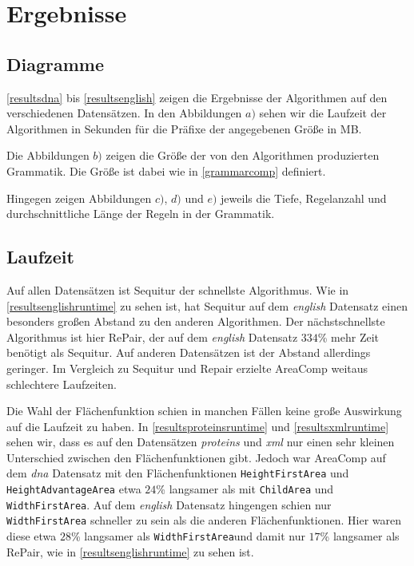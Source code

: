 \section{Ergebnisse}

\subsection{Diagramme}
\label{diagrams}

\autoref{resultsdna} bis \ref{resultsenglish} zeigen die Ergebnisse der Algorithmen auf den verschiedenen Datensätzen. In den Abbildungen $a)$ sehen wir die Laufzeit der Algorithmen in Sekunden für die Präfixe der angegebenen Größe in MB.

Die Abbildungen $b)$ zeigen die Größe der von den Algorithmen produzierten Grammatik. Die Größe ist dabei wie in \autoref{grammarcomp} definiert.

Hingegen zeigen Abbildungen $c)$, $d)$ und $e)$ jeweils die Tiefe, Regelanzahl und durchschnittliche Länge der Regeln in der Grammatik. 

\subsection{Laufzeit}

Auf allen Datensätzen ist Sequitur der schnellste Algorithmus. Wie in \autoref{resultsenglishruntime} zu sehen ist, hat Sequitur auf dem \emph{english} Datensatz einen besonders großen Abstand zu den anderen Algorithmen. Der nächstschnellste Algorithmus ist hier RePair, der auf dem \emph{english} Datensatz $334$\% mehr Zeit benötigt als Sequitur. Auf anderen Datensätzen ist der Abstand allerdings geringer.
Im Vergleich zu Sequitur und Repair erzielte AreaComp weitaus schlechtere Laufzeiten.

Die Wahl der Flächenfunktion schien in manchen Fällen keine große Auswirkung auf die Laufzeit zu haben. In \autoref{resultsproteinsruntime} und \autoref{resultsxmlruntime} sehen wir, dass es auf den Datensätzen \emph{proteins} und \emph{xml} nur einen sehr kleinen Unterschied zwischen den Flächenfunktionen gibt. 
Jedoch war AreaComp auf dem \emph{dna} Datensatz mit den Flächenfunktionen \texttt{HeightFirstArea} und \texttt{HeightAdvantageArea} etwa $24$\% langsamer als mit \texttt{ChildArea} und \texttt{WidthFirstArea}. Auf dem \emph{english} Datensatz hingengen schien nur \texttt{WidthFirstArea} schneller zu sein als die anderen Flächenfunktionen. Hier waren diese etwa $28$\% langsamer als \texttt{WidthFirstArea}und damit nur $17$\% langsamer als RePair, wie in \autoref{resultsenglishruntime} zu sehen ist.

